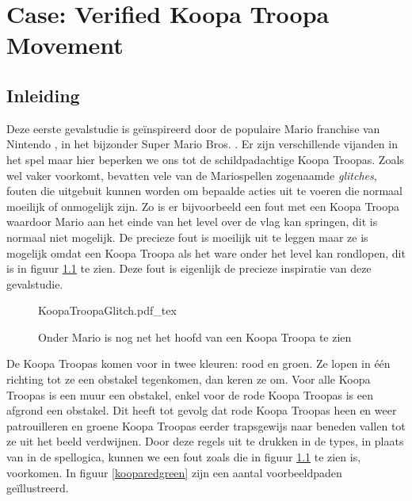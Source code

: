 \chapter{Case: Verified Koopa Troopa Movement}
\label{ch:case-koopa}


\section{Inleiding}

Deze eerste gevalstudie is geïnspireerd door de populaire Mario \cite{mario}
franchise van Nintendo \cite{nintendo}, in het bijzonder Super Mario Bros.
\cite{supmario}. Er zijn verschillende vijanden in het spel maar hier beperken
we ons tot de schildpadachtige Koopa Troopas. Zoals wel vaker voorkomt,
bevatten vele van de Mariospellen zogenaamde \emph{glitches}, fouten die
uitgebuit kunnen worden om bepaalde acties uit te voeren die normaal moeilijk
of onmogelijk zijn. Zo is er bijvoorbeeld een fout met een Koopa Troopa
waardoor Mario aan het einde van het level over de vlag kan springen, dit is
normaal niet mogelijk. De precieze fout is moeilijk uit te leggen maar ze is
mogelijk omdat een Koopa Troopa als het ware onder het level kan rondlopen, dit
is in figuur \ref{koopaglitch} te zien. Deze fout is eigenlijk de precieze
inspiratie van deze gevalstudie.

\begin{figure}
  \centering
  \def\svgwidth{\textwidth}
  {KoopaTroopaGlitch.pdf\string_tex}
  \caption{Onder Mario is nog net het hoofd van een Koopa Troopa te zien
           \cite{marioglitchyoutube}}
  \label{koopaglitch}
\end{figure}

De Koopa Troopas komen voor in twee kleuren: rood en groen. Ze lopen in één
richting tot ze een obstakel tegenkomen, dan keren ze om. Voor alle Koopa
Troopas is een muur een obstakel, enkel voor de rode Koopa Troopas is een
afgrond een obstakel. Dit heeft tot gevolg dat rode Koopa Troopas heen en weer
patrouilleren en groene Koopa Troopas eerder trapsgewijs naar beneden vallen
tot ze uit het beeld verdwijnen. Door deze regels uit te drukken in de types,
in plaats van in de spellogica, kunnen we een fout zoals die in figuur
\ref{koopaglitch} te zien is, voorkomen. In figuur \ref{kooparedgreen} zijn een
aantal voorbeeldpaden geïllustreerd.


